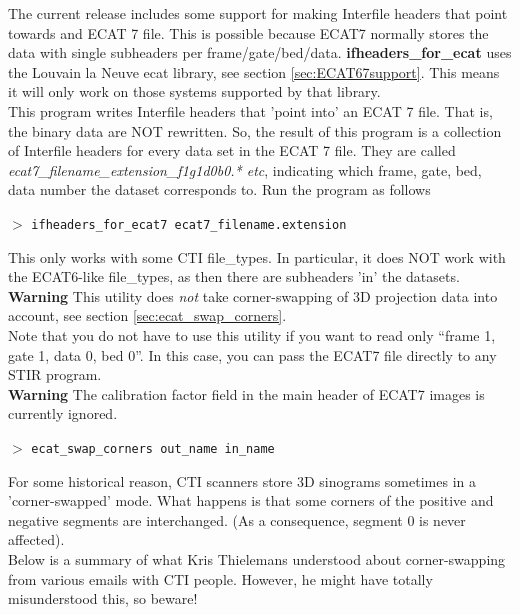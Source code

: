 \documentclass{article}
\newcommand{\cmdline}[1]{\par \noindent $>$ \texttt{#1}\par}
\begin{document}
{ 
}

The current release includes some support for making Interfile 
headers that point towards and ECAT 7 file. This is possible 
because ECAT7 normally stores the data with single subheaders 
per frame/gate/bed/data. \textbf{ifheaders\_for\_ecat} uses the Louvain 
la Neuve ecat library, see section \ref{sec:ECAT67support}. 
This means it will only work on those systems 
supported by that library. \\
This program writes Interfile headers that 'point into' an ECAT 
7 file. That is, the binary data are NOT rewritten. So, the result 
of this program is a collection of Interfile headers for every 
data set in the ECAT 7 file. They are called \textit{ecat7\_filename\_extension\_f1g1d0b0.* 
etc}, indicating which frame, gate, bed, data number the dataset 
corresponds to. Run the program as follows
\cmdline{ifheaders\_for\_ecat7 ecat7\_filename.extension}


This only works with some CTI file\_types. In particular, it 
does NOT work with the ECAT6-like file\_types, as then there 
are subheaders 'in' the datasets.\\
\textbf{Warning} This utility does \textit{not} take corner-swapping of 
3D projection data into account, see section \ref{sec:ecat_swap_corners}.\\
Note that you do not have to use this utility if you want to 
read only ``frame 1, gate 1, data 0, bed 0''. In this case, you 
can pass the ECAT7 file directly to any STIR program.
\\
\textbf{Warning} The calibration factor field in the main header of ECAT7 images
is currently ignored.

{ 
}
\label{sec:ecat_swap_corners}

{ 
}
\cmdline{ecat\_swap\_corners out\_name in\_name}

{ 
}

For some historical reason, CTI scanners store 3D sinograms sometimes 
in a 'corner-swapped' mode. What happens is that some corners 
of the positive and negative segments are interchanged. (As a 
consequence, segment 0 is never affected).\\
Below is a summary of what Kris Thielemans understood about corner-swapping 
from various emails with CTI people. However, he might have totally 
misunderstood this, so beware!
\end{document}
